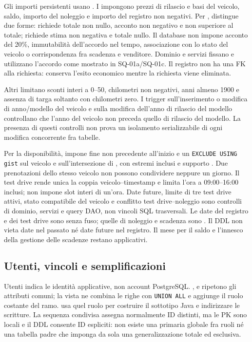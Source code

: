 Gli importi persistenti usano . I 
impongono prezzi di rilascio e basi del veicolo, saldo, importo del
noleggio e importo del registro non negativi. Per ,
 distingue due forme:  richiede
totale non nullo, acconto non negativo e non superiore al totale;
 richiede stima non negativa e totale nullo.
Il database non impone acconto del 20\%, immutabilità dell'accordo nel
tempo, associazione con lo stato del veicolo o corrispondenza fra scadenza
e venditore. Dominio e servizi fissano e utilizzano l'accordo come mostrato
in SQ-01a/SQ-01c. Il registro non ha una FK alla richiesta: conserva
l'esito economico mentre la richiesta viene eliminata.

Altri  limitano sconti interi a 0--50, chilometri non
negativi, anni almeno 1900 e assenza di targa soltanto con chilometri zero.
I trigger sull'inserimento o modifica di anno/modello del veicolo e sulla
modifica dell'anno di rilascio del modello controllano
che l'anno del veicolo non preceda quello di rilascio del modello.
La presenza di questi controlli non prova un isolamento serializzabile
di ogni modifica concorrente fra tabelle.

Per la disponibilità,  impone fine non precedente all'inizio
e un \texttt{EXCLUDE USING gist} sul veicolo e sull'intersezione di
, con estremi inclusi e supporto
. Due prenotazioni dello stesso veicolo non possono
condividere neppure un giorno. Il test drive rende unica la coppia
veicolo--timestamp e limita l'ora a 09:00--16:00 inclusi; non impone
slot interi di un'ora. Date future, limite di tre test drive attivi,
stato compatibile del veicolo e conflitto test drive--noleggio sono
controlli di dominio, servizi e query DAO, non vincoli SQL trasversali.
Le date del registro e dei test drive sono  senza fuso;
quelle di noleggio e scadenza sono . Il DDL non vieta date
nel passato né date future nel registro. Il mese per il saldo e
l'innesco della gestione delle scadenze restano applicativi.

\subsection{Utenti, vincoli e semplificazioni}
\guillemotleft{}Utenti\guillemotright{} indica le identità applicative, non account PostgreSQL.
,  e  ripetono gli attributi
comuni; la vista  ne combina le righe con \texttt{UNION ALL}
e aggiunge il ruolo costante del ramo.  usa quel
ruolo per costruire il sottotipo Java e indirizzare le scritture.
La sequenza condivisa  assegna normalmente ID
distinti, ma le PK sono locali e il DDL consente ID espliciti:
non esiste una primaria globale fra ruoli né una tabella padre che
imponga da sola una generalizzazione totale ed esclusiva.

